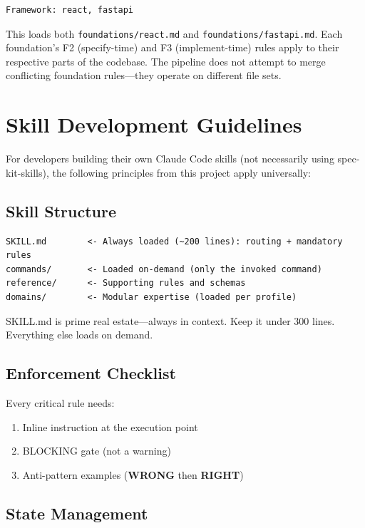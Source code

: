 \documentclass[11pt,a4paper,openright,twoside]{report}
\newcommand{\file}[1]{\texttt{#1}}
\newcommand{\wrong}{\textcolor{specred}{\textbf{WRONG}}}
\newcommand{\rightlabel}{\textcolor{specgreen}{\textbf{RIGHT}}}
\begin{document}
\begin{lstlisting}[title={Multi-Framework Domain Profile}]
Framework: react, fastapi
\end{lstlisting}

This loads both \file{foundations/react.md} and \file{foundations/fastapi.md}. Each foundation's F2 (specify-time) and F3 (implement-time) rules apply to their respective parts of the codebase. The pipeline does not attempt to merge conflicting foundation rules---they operate on different file sets.

\section{Skill Development Guidelines}

For developers building their own Claude Code skills (not necessarily using spec-kit-skills), the following principles from this project apply universally:

\subsection{Skill Structure}

\begin{lstlisting}[title={Recommended Skill Structure}]
SKILL.md        <- Always loaded (~200 lines): routing + mandatory rules
commands/       <- Loaded on-demand (only the invoked command)
reference/      <- Supporting rules and schemas
domains/        <- Modular expertise (loaded per profile)
\end{lstlisting}

SKILL.md is prime real estate---always in context. Keep it under 300 lines. Everything else loads on demand.

\subsection{Enforcement Checklist}

Every critical rule needs:
\begin{enumerate}
  \item Inline instruction at the execution point
  \item BLOCKING gate (not a warning)
  \item Anti-pattern examples (\wrong{} then \rightlabel{})
\end{enumerate}

\subsection{State Management}
\end{document}
